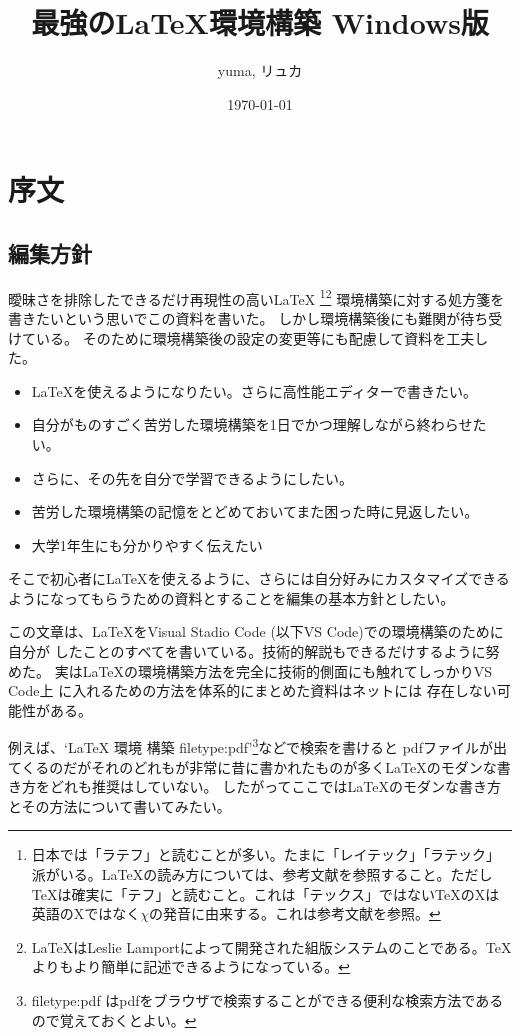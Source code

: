 \documentclass[titlepage]{ltjsarticle}
\begin{document}
\title{最強の\LaTeX 環境構築 Windows版}
\author{yuma, リュカ}
\date{\today}
\maketitle
\section{序文}
\subsection{編集方針}

曖昧さを排除したできるだけ再現性の高い\LaTeX \index{\LaTeX}
\footnote{日本では「ラテフ」と読むことが多い。たまに「レイテック」「ラテック」派がいる。\LaTeX の読み方については、参考文献\cite{文書システムLaTeX}\cite{LaTeXの読み方}を参照すること。ただし\TeX は確実に「テフ」と読むこと。これは「テックス」ではない\TeX のXは英語のXではなく\(\chi\)の発音に由来する。これは参考文献\cite{TeXの発音について}を参照。}\footnote{\LaTeX はLeslie Lamportによって開発された組版システムのことである。\TeX よりもより簡単に記述できるようになっている。}
環境構築に対する処方箋を書きたいという思いでこの資料を書いた。
しかし環境構築後にも難関が待ち受けている。
そのために環境構築後の設定の変更等にも配慮して資料を工夫した。
\begin{itemize}
  \item \LaTeX を使えるようになりたい。さらに高性能エディターで書きたい。
  \item 自分がものすごく苦労した環境構築を1日でかつ理解しながら終わらせたい。
  \item さらに、その先を自分で学習できるようにしたい。
  \item 苦労した環境構築の記憶をとどめておいてまた困った時に見返したい。
  \item 大学1年生にも分かりやすく伝えたい
\end{itemize}
そこで初心者に\LaTeX を使えるように、さらには自分好みにカスタマイズできるようになってもらうための資料とすることを編集の基本方針としたい。

この文章は、\LaTeX をVisual Stadio Code (以下VS Code)での環境構築のために自分が
したことのすべてを書いている。技術的解説もできるだけするように努めた。
実は\LaTeX の環境構築方法を完全に技術的側面にも触れてしっかりVS Code上
に入れるための方法を体系的にまとめた資料はネットには
存在しない可能性がある。

例えば、`LaTeX 環境 構築 filetype:pdf'\footnote{filetype:pdf はpdfをブラウザで検索することができる便利な検索方法であるので覚えておくとよい。}などで検索を書けると
pdfファイルが出てくるのだがそれのどれもが非常に昔に書かれたものが多く\LaTeX のモダンな書き方をどれも推奨はしていない。
したがってここでは\LaTeX のモダンな書き方とその方法について書いてみたい。
\end{document}
